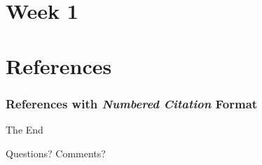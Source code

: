 \section{Week 1}



\section{References}

\begin{frame}
	\frametitle{References with \textit{Numbered Citation} Format}
 \tiny
\nocite{*}
\printbibliography[heading=none]
\end{frame}


\begin{frame}[plain,c] %
	\begin{center}
		{\Huge The End}

		\bigskip\bigskip %

		{\LARGE Questions? Comments?}
	\end{center}
\end{frame}



